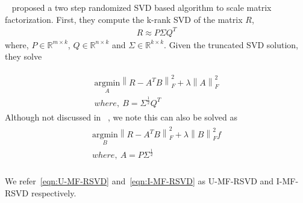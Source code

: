 

~\citep{Tang:2013} proposed a two step randomized SVD based algorithm to scale matrix factorization. First, they compute the k-rank SVD of the matrix $R$,
\begin{align*}
	R \approx P \Sigma Q^T
\end{align*}
where, $P \in \mathbb{R}^{m \times k}$, $Q \in \mathbb{R}^{n \times k}$ and $\Sigma \in \mathbb{R}^{k \times k}$. Given the truncated SVD solution, they solve 

\begin{align}
\label{eqn:I-MF-RSVD}
\begin{split}
\underset{A}{\mathrm{argmin}}  \left \| R - A^TB\right \|_F^2 + \lambda \left \|  A \right \|_F^2   \\
where,\ B = \Sigma^{\frac{1}{2}} Q^T 
\end{split}
\end{align}
Although not discussed in ~\citep{Tang:2013}, we note this can also be solved as 
\begin{align}
\label{eqn:U-MF-RSVD}
\begin{split}
\underset{B}{\mathrm{argmin}}  \left \| R - A^TB\right \|_F^2 + \lambda \left \|  B \right \|_F^2 f\\
where,\ A = P \Sigma^{\frac{1}{2}}\\
\end{split}
\end{align}

We refer~\ref{eqn:U-MF-RSVD} and~\ref{eqn:I-MF-RSVD} as U-MF-RSVD and I-MF-RSVD respectively. 
